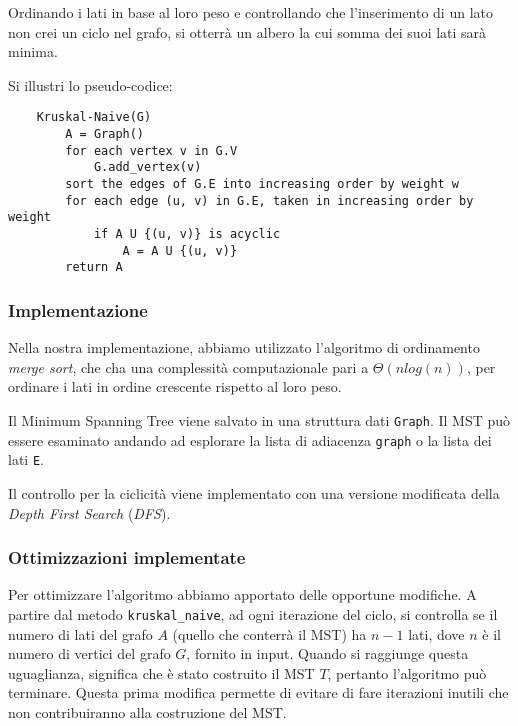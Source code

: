 Ordinando i lati in base al loro peso e controllando che l'inserimento
di un lato non crei un ciclo nel grafo, si otterrà un albero la cui
somma dei suoi lati sarà minima.

Si illustri lo pseudo-codice:
\begin{verbatim}
    Kruskal-Naive(G)
        A = Graph()
        for each vertex v in G.V
            G.add_vertex(v)
        sort the edges of G.E into increasing order by weight w
        for each edge (u, v) in G.E, taken in increasing order by weight
            if A U {(u, v)} is acyclic
                A = A U {(u, v)}
        return A
\end{verbatim}

\subsubsection{Implementazione}

Nella nostra implementazione, abbiamo utilizzato l'algoritmo di
ordinamento \textit{merge sort}, che cha una complessità
computazionale pari a $\Theta(n log(n))$, per ordinare i lati
in ordine crescente rispetto al loro peso.

Il Minimum Spanning Tree viene salvato in una struttura dati
\verb|Graph|. Il MST può essere esaminato andando ad
esplorare la lista di adiacenza \verb|graph| o la lista dei
lati \verb|E|.

Il controllo per la ciclicità viene implementato con una
versione modificata della \textit{Depth First Search}
(\textit{DFS}).

\subsubsection{Ottimizzazioni implementate}

Per ottimizzare l'algoritmo abbiamo apportato delle opportune
modifiche. A partire dal metodo \verb|kruskal_naive|, ad
ogni iterazione del ciclo, si controlla se il numero di lati
del grafo $A$ (quello che conterrà il MST) ha $n - 1$ lati,
dove $n$ è il numero di vertici del grafo $G$, fornito in input.
Quando si raggiunge questa uguaglianza, significa che è stato
costruito il MST $T$, pertanto l'algoritmo può terminare.
Questa prima modifica permette di evitare di fare iterazioni
inutili che non contribuiranno alla costruzione del MST.

